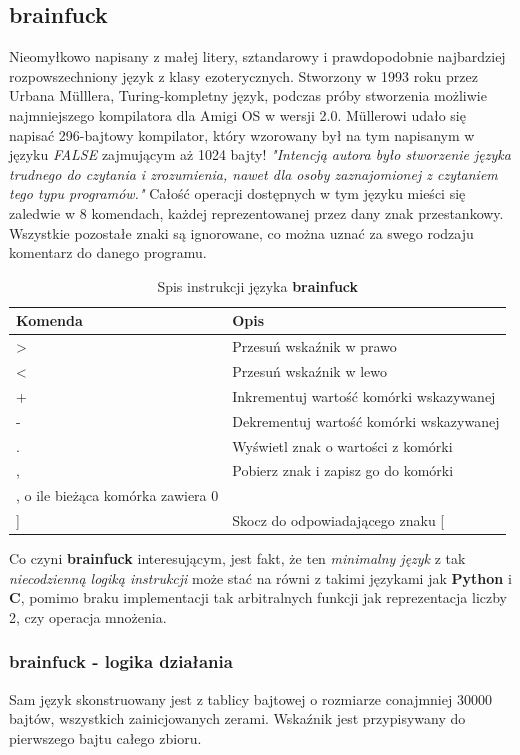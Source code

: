 \documentclass[fleqn,10pt]{SelfArx} %
\newcommand{\tabline}{\tabularnewline\hline}
\begin{document}
\subsection{brainfuck}
Nieomyłkowo napisany z małej litery, sztandarowy i prawdopodobnie najbardziej rozpowszechniony język z klasy ezoterycznych.
Stworzony w 1993 roku przez Urbana M\"ulllera, Turing-kompletny język, podczas próby stworzenia możliwie najmniejszego kompilatora
dla Amigi OS w wersji 2.0. M\"ullerowi udało się napisać 296-bajtowy kompilator, który wzorowany był na tym napisanym w języku \textit{FALSE} zajmującym aż 1024 bajty!
\textit{"Intencją autora było stworzenie języka trudnego do czytania i zrozumienia, nawet dla osoby zaznajomionej z czytaniem tego typu programów."}\cite{mathis2011brainfuck}
Całość operacji dostępnych w tym języku mieści się zaledwie w 8 komendach, każdej reprezentowanej przez dany znak przestankowy.
Wszystkie pozostałe znaki są ignorowane, co można uznać za swego rodzaju komentarz do danego programu.
\begin{table}[H]
\begin{center}
	\begin{tabular}{| >{\centering}p{1.5cm} | p{5cm}|}
		\hline
		\textbf{Komenda} & \centering\textbf{Opis} \tabline
		> & Przesuń wskaźnik w prawo \tabline
		< & Przesuń wskaźnik w lewo \tabline
		+ & Inkrementuj wartość komórki wskazywanej \tabline
		- & Dekrementuj wartość komórki wskazywanej \tabline
		. & Wyświetl znak o wartości z komórki \tabline
		, & Pobierz znak i zapisz go do komórki \tabline
		[ & Skocz bezpośrednio za odpowiadający znak ], o ile bieżąca komórka zawiera 0 \tabline
		] & Skocz do odpowiadającego znaku [ \tabline
	\end{tabular}
\end{center}
\caption{Spis instrukcji języka \textbf{brainfuck}}
\label{tab:brainfuckInstrukcje}
\end{table}

Co czyni \textbf{brainfuck} interesującym, jest fakt, że ten \textit{minimalny język} z tak \textit{niecodzienną logiką instrukcji}
może stać na równi z takimi językami jak \textbf{Python} i \textbf{C}, pomimo braku implementacji tak arbitralnych funkcji jak reprezentacja liczby 2, 
czy operacja mnożenia.%

\subsubsection{brainfuck - logika działania}
Sam język skonstruowany jest z tablicy bajtowej o rozmiarze conajmniej 30000 bajtów, wszystkich zainicjowanych zerami. 
Wskaźnik jest przypisywany do pierwszego bajtu całego zbioru.
\end{document}
